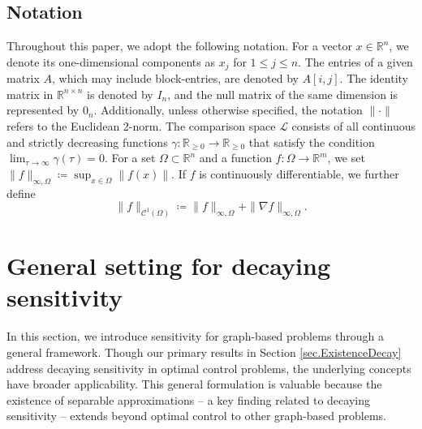 \documentclass{article}
\newcommand{\R}{\mathbb{R}}
\newcommand{\Rn}{\R^n}
\newcommand{\Rm}{\R^m}
\begin{document}
\subsection{Notation}
Throughout this paper, we adopt the following notation. For a vector \( x \in \Rn \), we denote its one-dimensional components as \( x_j \) for \( 1 \leq j \leq n \). The entries of a given matrix \( A \), which may include block-entries, are denoted by \( A[i,j] \). The identity matrix in \( \mathbb{R}^{n \times n} \) is denoted by \( I_n \), and the null matrix of the same dimension is represented by \( 0_n \). Additionally, unless otherwise specified, the notation \( \| \cdot \| \) refers to the Euclidean 2-norm. The comparison space \( \mathcal{L} \) consists of all continuous and strictly decreasing functions \( \gamma \colon \mathbb{R}_{\geq 0} \to \mathbb{R}_{\geq 0} \) that satisfy the condition \( \lim_{\tau \to \infty} \gamma(\tau) = 0 \).  For a set $\Omega \subset \Rn$ and a function $f \colon \Omega \to \Rm$, we set
$
    \lVert f \rVert_{\infty, \Omega} \coloneqq \sup_{x \in \Omega} \lVert f(x) \rVert.
$
If $f$ is continuously differentiable, we further define 
\begin{equation*}
    \| f \|_{\mathcal{C}^1(\Omega)} \coloneqq \| f \|_{\infty, \Omega} + \| \nabla f \|_{\infty, \Omega}. 
\end{equation*}

\section{General setting for decaying sensitivity} \label{sec:setting}

In this section, we introduce sensitivity for graph-based problems through a general framework. Though our primary results in Section \ref{sec.ExistenceDecay} address decaying sensitivity in optimal control problems, the underlying concepts have broader applicability. This general formulation is valuable because the existence of separable approximations -- a key finding related to decaying sensitivity -- extends beyond optimal control to other graph-based problems.
\end{document}
